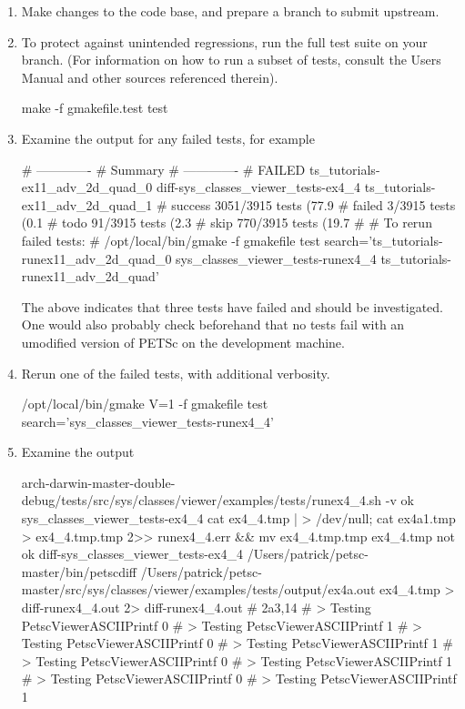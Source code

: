 \begin{enumerate}
\item Make changes to the code base, and prepare a branch to submit upstream.
\item To protect against unintended regressions, run the full test suite on your branch. (For information on how to run a subset of tests, consult the Users Manual and other sources referenced therein).
\begin{bashlisting}
make -f gmakefile.test test
\end{bashlisting}
\item Examine the output for any failed tests, for example
\begin{outputlisting}
# -------------
#   Summary
# -------------
# FAILED ts_tutorials-ex11_adv_2d_quad_0 diff-sys_classes_viewer_tests-ex4_4 ts_tutorials-ex11_adv_2d_quad_1
# success 3051/3915 tests (77.9%
# failed 3/3915 tests (0.1%
# todo 91/3915 tests (2.3%
# skip 770/3915 tests (19.7%
#
# To rerun failed tests:
#     /opt/local/bin/gmake -f gmakefile test search='ts_tutorials-runex11_adv_2d_quad_0 sys_classes_viewer_tests-runex4_4 ts_tutorials-runex11_adv_2d_quad'
\end{outputlisting}
The above indicates that three tests have failed and should be investigated. One would also probably check beforehand that no tests fail with an umodified version of PETSc on the development machine.
\item Rerun one of the failed tests, with additional verbosity.
\begin{bashlisting}
/opt/local/bin/gmake V=1 -f gmakefile test search='sys_classes_viewer_tests-runex4_4'
\end{bashlisting}
\item Examine the output
\begin{outputlisting}
arch-darwin-master-double-debug/tests/src/sys/classes/viewer/examples/tests/runex4_4.sh  -v
ok sys_classes_viewer_tests-ex4_4 cat ex4_4.tmp | > /dev/null; cat ex4a1.tmp > ex4_4.tmp.tmp 2>> runex4_4.err && mv ex4_4.tmp.tmp ex4_4.tmp
not ok diff-sys_classes_viewer_tests-ex4_4 /Users/patrick/petsc-master/bin/petscdiff  /Users/patrick/petsc-master/src/sys/classes/viewer/examples/tests/output/ex4a.out ex4_4.tmp > diff-runex4_4.out 2> diff-runex4_4.out
#	2a3,14
#	> Testing PetscViewerASCIIPrintf 0
#	> Testing PetscViewerASCIIPrintf 1
#	> Testing PetscViewerASCIIPrintf 0
#	> Testing PetscViewerASCIIPrintf 1
#	> Testing PetscViewerASCIIPrintf 0
#	> Testing PetscViewerASCIIPrintf 1
#	> Testing PetscViewerASCIIPrintf 0
#	> Testing PetscViewerASCIIPrintf 1

\end{outputlisting}
\end{enumerate}
